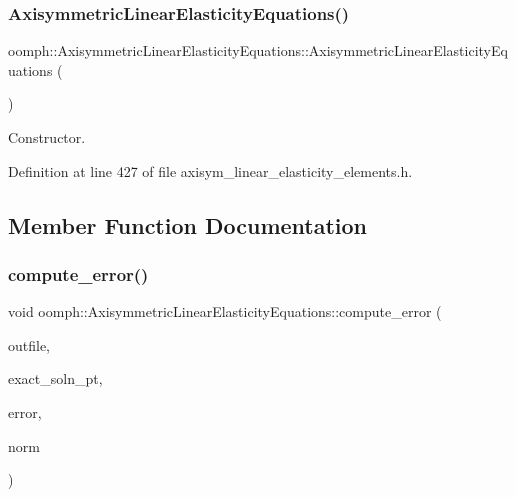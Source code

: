 \subsubsection{\texorpdfstring{Axisymmetric\+Linear\+Elasticity\+Equations()}{AxisymmetricLinearElasticityEquations()}}
{\footnotesize\ttfamily oomph\+::\+Axisymmetric\+Linear\+Elasticity\+Equations\+::\+Axisymmetric\+Linear\+Elasticity\+Equations (\begin{DoxyParamCaption}{ }\end{DoxyParamCaption})\hspace{0.3cm}{\ttfamily [inline]}}



Constructor. 



Definition at line 427 of file axisym\+\_\+linear\+\_\+elasticity\+\_\+elements.\+h.



\subsection{Member Function Documentation}
\mbox{\label{classoomph_1_1AxisymmetricLinearElasticityEquations_ac8d00d39dc3bbfe9125fffe3f498982b}} 
\subsubsection{\texorpdfstring{compute\+\_\+error()}{compute\_error()}\hspace{0.1cm}{\footnotesize\ttfamily [1/2]}}
{\footnotesize\ttfamily void oomph\+::\+Axisymmetric\+Linear\+Elasticity\+Equations\+::compute\+\_\+error (\begin{DoxyParamCaption}\item[{std\+::ostream \&}]{outfile,  }\item[{\hyperlink{classoomph_1_1FiniteElement_a690fd33af26cc3e84f39bba6d5a85202}{Finite\+Element\+::\+Steady\+Exact\+Solution\+Fct\+Pt}}]{exact\+\_\+soln\+\_\+pt,  }\item[{double \&}]{error,  }\item[{double \&}]{norm }\end{DoxyParamCaption})\hspace{0.3cm}{\ttfamily [virtual]}}

